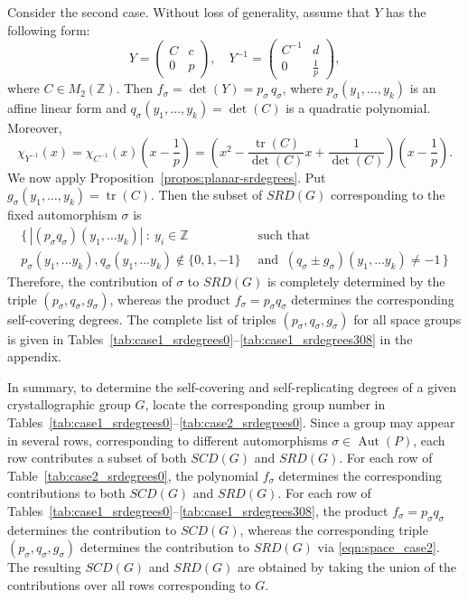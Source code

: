 \documentclass[draft]{adm-paper}
\DeclareMathOperator{\tr}{tr}
\theoremstyle{definition}
\begin{document}
Consider the second case. Without loss of generality, assume that $Y$ has the following form:
\[
Y = \begin{pmatrix}
  C & c \\
  0 & p
\end{pmatrix},
\quad
Y^{-1} = \begin{pmatrix}
  C^{-1} & d \\
  0      & \frac{1}{p}
\end{pmatrix},
\]
where $C\in M_2(\mathbb{Z})$. Then
$f_\sigma=\det(Y)=p_\sigma\,q_\sigma$, where
$p_\sigma(y_1,\ldots,y_k)$ is an affine linear form and
$q_\sigma(y_1,\ldots,y_k)=\det(C)$ is a quadratic polynomial. Moreover,
\[
\chi_{Y^{-1}}(x) = \chi_{C^{-1}}(x)\left(x - \frac{1}{p}\right) =
\left(x^2 - \frac{\tr(C)}{\det(C)}x + \frac{1}{\det(C)}\right)\left(x - \frac{1}{p}\right).
\]
We now apply Proposition~\ref{propos:planar-srdegrees}. Put
$g_\sigma(y_1,\ldots,y_k)=\operatorname{tr}(C)$. Then
the subset of $SRD(G)$ corresponding to the fixed automorphism $\sigma$ is
\begin{equation}\label{eqn:space_case2}
\begin{aligned}
\big\{ \, |(p_\sigma q_\sigma)(y_1, \dots y_k)| \ :  \ y_i \in \mathbb{Z} &\text{ such that } \\
  p_\sigma(y_1, \dots y_k), q_\sigma(y_1, \dots y_k)\not\in\{0,1,-1\} \ &\text{ and } \ (q_\sigma \pm g_\sigma)(y_1, \dots y_k) \neq -1 \, \big\}
\end{aligned}
\end{equation}
Therefore, the contribution of $\sigma$ to $SRD(G)$ is completely determined by the triple
$(p_\sigma,q_\sigma,g_\sigma)$, whereas the product
$f_\sigma=p_\sigma q_\sigma$ determines the corresponding self-covering degrees. The complete list of triples $(p_\sigma,q_\sigma,g_\sigma)$ for all space groups is given in Tables~\ref{tab:case1_srdegrees0}--\ref{tab:case1_srdegrees308} in the appendix.

In summary, to determine the self-covering and self-replicating degrees of a given crystallographic group $G$, locate
the corresponding group number in Tables~\ref{tab:case1_srdegrees0}--\ref{tab:case2_srdegrees0}. Since a group may appear
in several rows, corresponding to different automorphisms $\sigma\in\operatorname{Aut}(P)$, each row contributes a
subset of both $SCD(G)$ and $SRD(G)$. For each row of Table~\ref{tab:case2_srdegrees0}, the polynomial $f_\sigma$
determines the corresponding contributions to both $SCD(G)$ and $SRD(G)$. For each row of
Tables~\ref{tab:case1_srdegrees0}--\ref{tab:case1_srdegrees308}, the product $f_\sigma=p_\sigma q_\sigma$ determines
the contribution to $SCD(G)$, whereas the corresponding triple $(p_\sigma,q_\sigma,g_\sigma)$ determines the
contribution to $SRD(G)$ via \eqref{eqn:space_case2}. The resulting $SCD(G)$ and $SRD(G)$ are obtained by taking the union
of the contributions over all rows corresponding to $G$.
\end{document}
